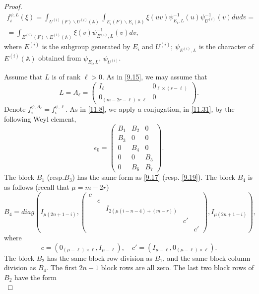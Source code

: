 \documentclass[12pts]{amsart}
\newcommand{\BA}{{\mathbb {A}}}
\begin{document}
\begin{proof}
\begin{multline}\label{11.31}
f_i^{\psi,L}(\xi)=
\int_{U^{(i)}(F)\backslash
	U^{(i)}(\BA)}\int_{E_i(F)\backslash E_i(\BA)}\xi(uv)\psi^{-1}_{E_i,L}(u)\psi^{-1}_{U^{(i)}}(v)dudv=\\
=\int_{E^{(i)}(F)\backslash
	E^{(i)}(\BA)}\xi(v)\psi^{-1}_{E^{(i)},L}(v)dv	,
\end{multline}
where $E^{(i)}$ is the subgroup generated by $E_i$ and $U^{(i)}$; $\psi_{E^{(i)},L}$ is the character of $E^{(i)}(\BA)$ obtained from $\psi_{E_i,L}$, $\psi_{U^{(i)}} $.

Assume that $L$ is of rank $\ell>0$. As in \eqref{9.15}, we may assume that 
\begin{equation}\label{11.31.1}
L=A_\ell=\begin{pmatrix}I_\ell&0_{\ell\times (r-\ell)}\\0_{(m-2r-\ell)\times\ell}&0\end{pmatrix}.
\end{equation}
Denote $f_i^{\psi,A_\ell} =f_i^{\psi,\ell}$. As in \eqref{11.8}, we apply a conjugation, in \eqref{11.31}, by the following Weyl element,	
\begin{equation}\label{11.32}
\epsilon_0=\begin{pmatrix}B_1&B_2&0\\B_3&0&0\\0&B_4&0\\0&0&B_5\\0&B_6&B_7\end{pmatrix}.
\end{equation}
The block $B_1$ (resp.$B_3$) has the same form as \eqref{9.17} (resp. \eqref{9.19}). The block $B_4$ is as follows (recall that $\mu=m-2r$)
\begin{equation}\label{11.33}
B_4=diag(I_{\mu(2n+1-i)},\begin{pmatrix}c\\&c\\&&I_{2(\mu (i-n-4)+(m-r))}\\&&&c'\\&&&&c'\end{pmatrix},I_{\mu (2n+1-i)}),
\end{equation}
where 
$$
c=(0_{(\mu-\ell)\times \ell},I_{\mu-\ell}), \quad c'=(I_{\mu-\ell},0_{(\mu-\ell)\times \ell}).
$$
The block $B_2$ has the same block row division as $B_1$, and the same block column division as $B_4$. The first $2n-1$ block rows are all zero. The last two block rows of $B_2$ have the form
\begin{equation}\label{11.34}

\end{equation}
\end{proof}
\end{document}
